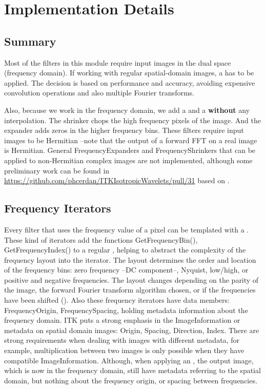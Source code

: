 \section{Implementation Details}
\label{sec:Impl}
\subsection{Summary}
\label{sub:Summary}

Most of the filters in this module require input images in the dual space (frequency domain). If working with regular spatial-domain images, a  has to be applied. The decision is based on performance and accuracy, avoiding expensive convolution operations and also multiple Fourier transforms.

Also, because we work in the frequency domain, we add a  and a  \textbf{without} any interpolation. The shrinker chops the high frequency pixels of the image. And the expander adds zeros in the higher frequency bins.
These filters require input images to be Hermitian --note that the output of a forward FFT on a real image is Hermitian.\newline
General FrequencyExpanders and FrequencyShrinkers that can be applied to non-Hermitian complex images are not implemented, although some preliminary work can be found in \url{https://github.com/phcerdan/ITKIsotropicWavelets/pull/31} based on \cite{portilla_image_2003}.

\subsection{Frequency Iterators}
\label{sub:frequencyiterators}
Every filter that uses the frequency value of a pixel can be templated with a .\newline
These kind of iterators add the functions GetFrequencyBin(), GetFrequencyIndex() to a regular , helping to abstract the complexity of the frequency layout into the iterator.
The layout determines the order and location of the frequency bins: zero frequency --DC component--, Nyquist, low/high, or positive and negative frequencies. The layout changes depending on the parity of the image, the forward Fourier transform algorithm chosen, or if the frequencies have been shifted ().\newline
Also these frequency iterators have data members: FrequencyOrigin, FrequencySpacing, holding metadata information about the frequency domain.\newline
ITK puts a strong emphasis in the ImageInformation or metadata on spatial domain images: Origin, Spacing, Direction, Index. There are strong requirements when dealing with images with different metadata, for example, multiplication between two images is only possible when they have compatible ImageInformation.\newline
Although, when applying an , the output image, which is now in the frequency domain, still have metadata referring to the spatial domain, but nothing about the frequency origin, or spacing between frequencies.

